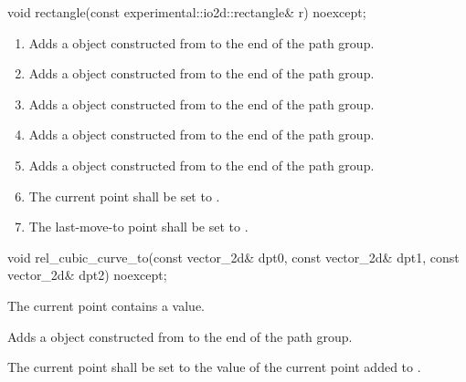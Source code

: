 \begin{itemdecl}
    void rectangle(const experimental::io2d::rectangle& r) noexcept;
\end{itemdecl}
\begin{itemdescr}
	\pnum
	\effects
	\begin{enumerate}
	\item Adds a  object constructed from  to the end of the path group.
	
	\item Adds a  object constructed from  to the end of the path group.
	
	\item Adds a  object constructed from  to the end of the path group.
	
	\item Adds a  object constructed from  to the end of the path group.
	
	\item Adds a  object constructed from  to the end of the path group.
	
	\item The current point shall be set to .
	
	\item The last-move-to point shall be set to .
	\end{enumerate}
\end{itemdescr}

\begin{itemdecl}
    void rel_cubic_curve_to(const vector_2d& dpt0, const vector_2d& dpt1,
      const vector_2d& dpt2) noexcept;
\end{itemdecl}
\begin{itemdescr}
	\pnum
	\requires
	The current point contains a value.
	
	\pnum
	\effects
	Adds a  object constructed from  to the end of the path group.
	
	\pnum
	The current point shall be set to the value of the current point added to .
\end{itemdescr}

